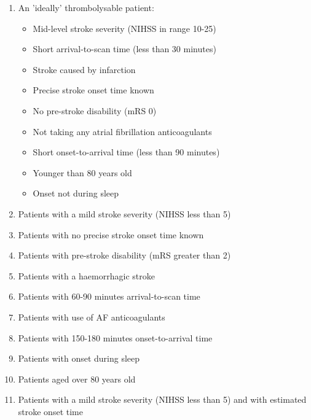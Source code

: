 
\iffalse
We analysed the observed and predicted use of thrombolysis in subgroups of patients. One `ideally' thrombolysable patient, and nine (one per feature) 'sub-optimal' thrombolysable patient groups (selecting patients based on one feature set to a sub-optimal value). We based the ideal definition on observing the relationships between feature values and thrombolysis use, and chose the 'sub-optimal' feature value by choosing a value that's within the contentious range for decision making (a feature value that corresponds with a SHAP value of zero, or the least favourable for binary features). The ten sub-groups are defined as:
\fi

\begin{enumerate}
  \item An 'ideally' thrombolysable patient:
  \begin{itemize}
    \item Mid-level stroke severity (NIHSS in range 10-25)
    \item Short arrival-to-scan time (less than 30 minutes)
    \item Stroke caused by infarction
    \item Precise stroke onset time known
    \item No pre-stroke disability (mRS 0)
    \item Not taking any atrial fibrillation anticoagulants
    \item Short onset-to-arrival time (less than 90 minutes)
    \item Younger than 80 years old
    \item Onset not during sleep
  \end{itemize}
  \item Patients with a mild stroke severity (NIHSS less than 5)
  \item Patients with no precise stroke onset time known
  \item Patients with pre-stroke disability (mRS greater than 2)
  \item Patients with a haemorrhagic stroke
  \item Patients with 60-90 minutes arrival-to-scan time
  \item Patients with use of AF anticoagulants
  \item Patients with 150-180 minutes onset-to-arrival time
  \item Patients with onset during sleep
  \item Patients aged over 80 years old
  \item Patients with a mild stroke severity (NIHSS less than 5) and with estimated stroke onset time
\end{enumerate}

